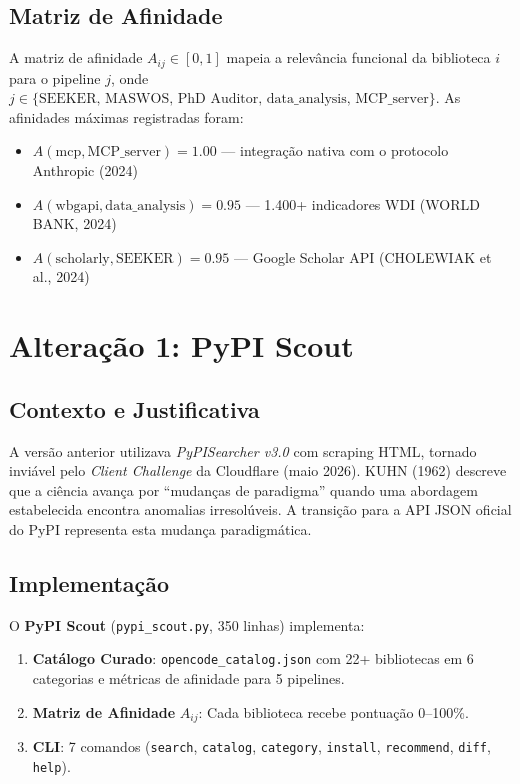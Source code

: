 \documentclass[12pt,a4paper]{article}
\begin{document}
\subsection{Matriz de Afinidade}

A matriz de afinidade $A_{ij} \in [0,1]$ mapeia a relevância funcional da biblioteca $i$ para o pipeline $j$, onde $j \in \{\text{SEEKER, MASWOS, PhD Auditor, data\_analysis, MCP\_server}\}$. As afinidades máximas registradas foram:

\begin{itemize}[itemsep=1pt]
  \item $A(\text{mcp}, \text{MCP\_server}) = 1.00$ --- integração nativa com o protocolo Anthropic (2024)
  \item $A(\text{wbgapi}, \text{data\_analysis}) = 0.95$ --- 1.400+ indicadores WDI (WORLD BANK, 2024)
  \item $A(\text{scholarly}, \text{SEEKER}) = 0.95$ --- Google Scholar API (CHOLEWIAK et al., 2024)
\end{itemize}

\section{Alteração 1: PyPI Scout}

\subsection{Contexto e Justificativa}

A versão anterior utilizava \textit{PyPISearcher v3.0} com scraping HTML, tornado inviável pelo \textit{Client Challenge} da Cloudflare (maio 2026). KUHN (1962) descreve que a ciência avança por ``mudanças de paradigma'' quando uma abordagem estabelecida encontra anomalias irresolúveis. A transição para a API JSON oficial do PyPI representa esta mudança paradigmática.

\subsection{Implementação}

O \textbf{PyPI Scout} (\texttt{pypi\_scout.py}, 350 linhas) implementa:

\begin{enumerate}[itemsep=1pt]
  \item \textbf{Catálogo Curado}: \texttt{opencode\_catalog.json} com 22+ bibliotecas em 6 categorias e métricas de afinidade para 5 pipelines.
  \item \textbf{Matriz de Afinidade} $A_{ij}$: Cada biblioteca recebe pontuação 0--100\%.
  \item \textbf{CLI}: 7 comandos (\texttt{search}, \texttt{catalog}, \texttt{category}, \texttt{install}, \texttt{recommend}, \texttt{diff}, \texttt{help}).
\end{enumerate}
\end{document}
